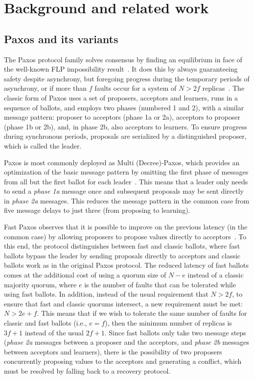 \section{Background and related work}
\label{sec:related} 
\subsection{Paxos and its variants} \label{Paxos} 

The Paxos protocol family solves consensus by finding an equilibrium in face of the well-known FLP impossibility result~\cite{FLP85}. It does this by always guaranteeing safety despite asynchrony, but
foregoing progress during the temporary periods of asynchrony, or if more than $f$ faults occur for a system of $N > 2f$ replicas~\cite{L01}. The classic form of Paxos uses a set of proposers, acceptors and learners, runs in a sequence of ballots, and employs two phases (numbered 1 and 2), with a similar message pattern: proposer to acceptors (phase 1a or 2a), acceptors to proposer (phase 1b or 2b), and, in phase 2b, also acceptors to learners. To ensure progress during synchronous periods, proposals are serialized by a distinguished proposer, which is called the leader.\par
Paxos is most commonly deployed as Multi (Decree)-Paxos, which provides an optimization of the basic message pattern by omitting the first phase of messages from all but the first ballot for each leader~\cite{Renesse2011}. This means that a leader only needs to send a \textit{phase 1a} message once and subsequent proposals may be sent directly in \textit{phase 2a} messages. This reduces the message pattern in the common case from five message delays to just three (from proposing to learning). \par
Fast Paxos observes that it is possible to improve on the previous latency (in the common case) by allowing proposers to propose values directly to acceptors~\cite{L06}. To this end, the protocol distinguishes between fast and classic ballots, where fast ballots bypass the leader by sending proposals directly to acceptors and classic ballots work as in the original Paxos protocol. The reduced latency of fast ballots comes at the additional cost of using a quorum size of $N-e$ instead of a classic majority quorum, where $e$ is the number of faults that can be tolerated while using fast ballots. In addition, instead of the usual requirement that $N> 2f$, to ensure that fast and classic quorums intersect, a new requirement must be met: $N > 2e+f$. This means that if we wish to tolerate the same number of faults for classic and fast ballots (i.e., $e=f$), then the minimum number of replicas is $3f+1$ instead of the usual $2f+1$. Since fast ballots only take two message steps (\textit{phase 2a} messages between a proposer and the acceptors, and \textit{phase 2b} messages between acceptors and learners), there is the possibility of two proposers concurrently proposing values to the acceptors and generating a conflict, which must be resolved by falling back to a recovery protocol. \par
